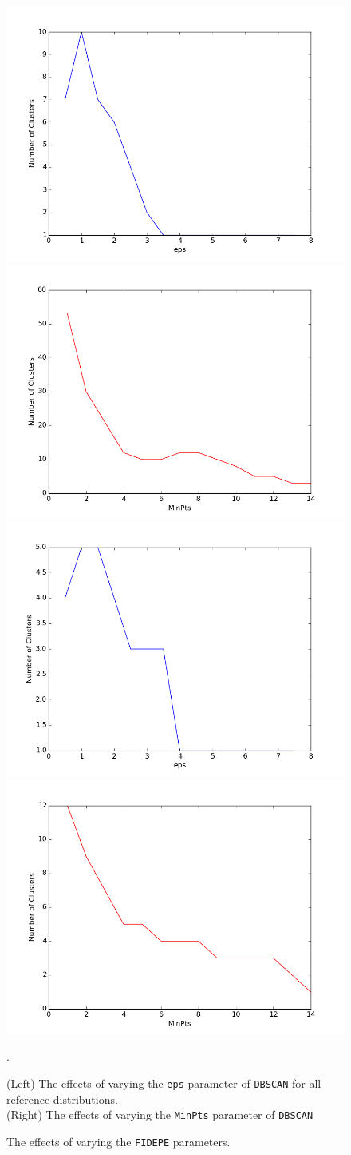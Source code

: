 \documentclass[12pt]{article}
\begin{document}
\begin{figure}[ht]
\includegraphics[width=0.35\linewidth]{plots/jain_eps}
\includegraphics[width=0.35\linewidth]{plots/jain_minpts} \\
\includegraphics[width=0.35\linewidth]{plots/spiral_eps}
\includegraphics[width=0.35\linewidth]{plots/spiral_minpts}
\caption{(Left) The effects of varying the \texttt{eps} parameter of \texttt{DBSCAN} for all reference distributions. \\ 
(Right) The effects of varying the \texttt{MinPts} parameter of \texttt{DBSCAN}}.
\label{fig:DBSCANplots}
\end{figure}


\begin{figure}[ht]
\centering

\caption{The effects of varying the \texttt{FIDEPE} parameters.}
\label{fig:FIDPEPEplots}
\end{figure}
\end{document}
